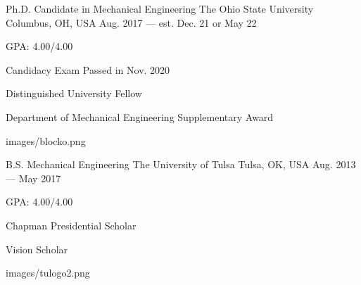 

\begin{cventries}
	
	\cveducation
	{Ph.D. Candidate in Mechanical Engineering} %
	{The Ohio State University} %
	{Columbus, OH, USA} %
	{Aug. 2017 --- est. Dec. 21 or May 22} %
	{
		\begin{cvitems} %
			\item {GPA: 4.00/4.00}
			\item {Candidacy Exam Passed in Nov. 2020}
			\item {Distinguished University Fellow}
			\item {Department of Mechanical Engineering Supplementary Award}
		\end{cvitems}
	}
	{images/blocko.png}

	\cveducation
    {B.S. Mechanical Engineering} %
    {The University of Tulsa} %
    {Tulsa, OK, USA} %
    {Aug. 2013 --- May 2017} %
    {
      \begin{cvitems} %
      	\item {GPA: 4.00/4.00}
        \item {Chapman Presidential Scholar}
        \item {Vision Scholar}
      \end{cvitems}
    }
	{images/tulogo2.png}
\end{cventries}

